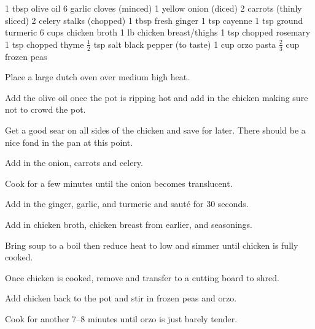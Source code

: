 \dishtype{}
\begin{ingreds}
    1 tbsp olive oil
    6 garlic cloves (minced)
    1 yellow onion (diced)
    2 carrots (thinly sliced)
    2 celery stalks (chopped)
    1 tbsp fresh ginger
    1 tsp cayenne
    1 tsp ground turmeric
    6 cups chicken broth
    1 lb chicken breast/thighs
    1 tsp chopped rosemary
    1 tsp chopped thyme
    $\frac{1}{2}$ tsp salt
    black pepper (to taste)
    1 cup orzo pasta
    $\frac{2}{3}$ cup frozen peas
\end{ingreds}
\begin{method}
    Place a large dutch oven over medium high heat.\par
    Add the olive oil once the pot is ripping hot and add in the chicken making sure not to crowd the pot.\par
    Get a good sear on all sides of the chicken and save for later. There should be a nice fond in the pan at this point.\par
    Add in the onion, carrots and celery.\par
    Cook for a few minutes until the onion becomes translucent.\par
    Add in the ginger, garlic, and turmeric and saut\'e for 30 seconds.\par
    Add in chicken broth, chicken breast from earlier, and seasonings.\par
    Bring soup to a boil then reduce heat to low and simmer until chicken is fully cooked.\par
    Once chicken is cooked, remove and transfer to a cutting board to shred.\par
    Add chicken back to the pot and stir in frozen peas and orzo.\par
    Cook for another 7--8 minutes until orzo is just barely tender.
\end{method}